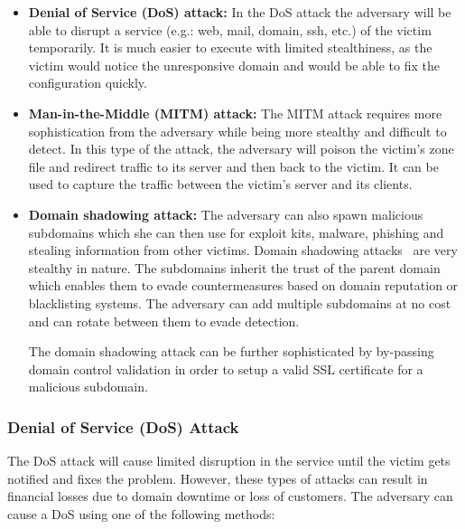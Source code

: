 \begin{itemize}
\item \textbf{Denial of Service (DoS) attack:} In the DoS attack the adversary will be able to disrupt a service (e.g.: web, mail, domain, ssh, etc.) of the victim temporarily. 
It is much easier to execute with limited stealthiness, as the victim would notice the unresponsive domain and would be able to fix the configuration quickly. 


\item \textbf{Man-in-the-Middle (MITM) attack:} The MITM attack requires more sophistication from the adversary while being more stealthy and difficult to detect. In this type of the attack, %
the adversary will %
poison the victim's zone file and redirect traffic to its server and then back to the victim. %
It can be used to capture the traffic between the victim's server and its clients. %

\item

\textbf{Domain
shadowing attack:} %
The adversary %
can also spawn malicious subdomains which she can then use for exploit kits, malware, phishing and stealing information from other victims. 
Domain shadowing attacks~\cite{shadowing} are %
very stealthy in nature. 
The subdomains inherit the trust of the parent domain which enables them to evade countermeasures based on domain reputation or blacklisting systems. 
The adversary can %
add multiple subdomains at no cost and can rotate between them to evade detection. 

The domain shadowing attack can be further sophisticated by by-passing domain control validation in order to setup a valid SSL certificate for a malicious subdomain.

\end{itemize}



\subsubsection{Denial of Service (DoS) Attack} 
The DoS attack will %
cause limited disruption in the service until the victim gets notified and fixes the problem. However, these types of attacks can result in financial losses due to domain downtime or loss of customers. The adversary can cause %
 a DoS using one of the following methods: %


